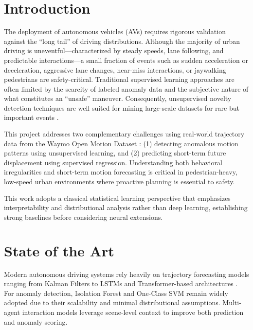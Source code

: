 \documentclass[conference]{IEEEtran}
\begin{document}
\section{Introduction}

The deployment of autonomous vehicles (AVs) requires rigorous validation against the ``long tail'' of driving distributions. Although the majority of urban driving is uneventful---characterized by steady speeds, lane following, and predictable interactions---a small fraction of events such as sudden acceleration or deceleration, aggressive lane changes, near-miss interactions, or jaywalking pedestrians are safety-critical. Traditional supervised learning approaches are often limited by the scarcity of labeled anomaly data and the subjective nature of what constitutes an ``unsafe'' maneuver. Consequently, unsupervised novelty detection techniques are well suited for mining large-scale datasets for rare but important events \cite{pimentel2014review}.

This project addresses two complementary challenges using real-world trajectory data from the Waymo Open Motion Dataset \cite{ettinger2021waymo}: (1) detecting anomalous motion patterns using unsupervised learning, and (2) predicting short-term future displacement using supervised regression. Understanding both behavioral irregularities and short-term motion forecasting is critical in pedestrian-heavy, low-speed urban environments where proactive planning is essential to safety.

This work adopts a classical statistical learning perspective that emphasizes interpretability and distributional analysis rather than deep learning, establishing strong baselines before considering neural extensions.

\section{State of the Art}

Modern autonomous driving systems rely heavily on trajectory forecasting models ranging from Kalman Filters to LSTMs and Transformer-based architectures \cite{pimentel2014review}. For anomaly detection, Isolation Forest \cite{liu2008isolation} and One-Class SVM \cite{scholkopf2001estimating} remain widely adopted due to their scalability and minimal distributional assumptions. Multi-agent interaction models leverage scene-level context to improve both prediction and anomaly scoring.
\end{document}
